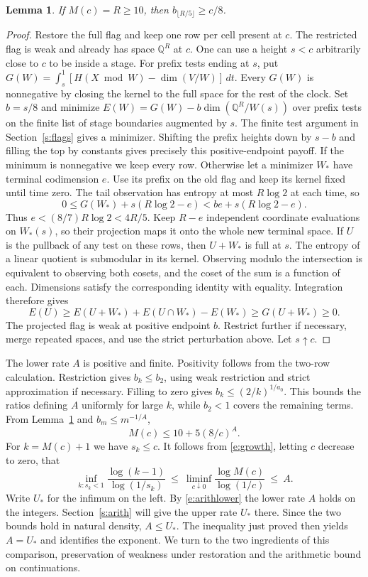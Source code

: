 \documentclass[11pt]{article}
\newtheorem{lemma}[theorem]{Lemma}
\numberwithin{equation}{section}
\newcommand{\Q}{\mathbb Q}
\begin{document}
\begin{lemma}\label{l:opening}
If $M(c)=R\ge10$, then $b_{\lfloor R/5\rfloor}\ge c/8$.
\end{lemma}
\begin{proof}
Restore the full flag and keep one row per cell present at $c$.
The restricted flag is weak and already has space $\Q^R$ at $c$.
One can use a height $s<c$ arbitrarily close to $c$ to be inside
a stage. For prefix tests ending at $s$, put
$G(W)=\int_s^1[H(X\bmod W)-\dim(V/W)]\,dt$. Every $G(W)$
is nonnegative by closing the kernel to the full space for the
rest of the clock. Set $b=s/8$ and minimize
$E(W)=G(W)-b\dim(\Q^R/W(s))$ over prefix tests on the finite
list of stage boundaries augmented by $s$. The finite test argument
in Section~\ref{s:flags} gives a minimizer. Shifting the prefix heights down by $s-b$ and filling the top
by constants gives precisely this positive-endpoint payoff. If the minimum is nonnegative
we keep every row. Otherwise let a minimizer $W_*$ have terminal
codimension $e$. Use its prefix on the old flag and keep its
kernel fixed until time zero. The tail observation has entropy
at most $R\log2$ at each time, so
\[
       0\le G(W_*)+s(R\log2-e)<be+s(R\log2-e).
\]
Thus $e<(8/7)R\log2<4R/5$. Keep $R-e$ independent coordinate
evaluations on $W_*(s)$, so their projection maps it onto the
whole new terminal space. If $U$ is the pullback of any test on these
rows, then $U+W_*$ is full at $s$. The entropy of a linear
quotient is submodular in its kernel. Observing modulo the
intersection is equivalent to observing both cosets, and the coset
of the sum is a function of each. Dimensions satisfy the corresponding
identity with equality. Integration therefore gives
\[
  E(U)\ge E(U+W_*)+E(U\cap W_*)-E(W_*)\ge G(U+W_*)\ge0.
\]
The projected flag is weak at positive endpoint $b$. Restrict
further if necessary, merge repeated spaces, and use the strict
perturbation above. Let $s\uparrow c$.
\end{proof}

The lower rate $A$ is positive and finite. Positivity follows from the two-row calculation. Restriction gives $b_k\le b_2$,
using weak restriction and strict approximation if necessary.
Filling to zero gives $b_k\le(2/k)^{1/a_0}$. This bounds the
ratios defining $A$ uniformly for large $k$, while $b_2<1$ covers
the remaining terms. From Lemma~\ref{l:opening} and $b_m\le m^{-1/A}$,
\begin{equation}
                    M(c)\le 10+5(8/c)^A . \label{e:growth}
\end{equation}
For $k=M(c)+1$ we have $s_k\le c$. It follows from \eqref{e:growth},
letting $c$ decrease to zero, that
\[
 \inf_{k:s_k<1}\frac{\log(k-1)}{\log(1/s_k)}
       \ \le\ \liminf_{c\downarrow0}\frac{\log M(c)}{\log(1/c)}
       \ \le\ A .
\]
Write $U_*$ for the infimum on the left. By \eqref{e:arithlower}
the lower rate $A$ holds on the integers. Section~\ref{s:arith} will
give the upper rate $U_*$ there. Since the two bounds hold in
natural density, $A\le U_*$. The inequality just proved then yields
$A=U_*$ and identifies the exponent. We turn to the two ingredients of this comparison, preservation of
weakness under restoration and the arithmetic bound on continuations.
\end{document}
